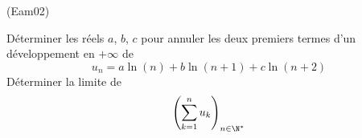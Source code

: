 \begin{tiny}(Eam02)\end{tiny}
Déterminer les réels $a$, $b$, $c$ pour annuler les deux premiers termes d'un développement en $+\infty$ de
\begin{displaymath}
 u_n = a\ln(n)+b\ln(n+1)+c\ln(n+2)
\end{displaymath}
Déterminer la limite de
\begin{displaymath}
 \left( \sum_{k=1}^n u_k\right)_{n\in \N^*} 
\end{displaymath}
